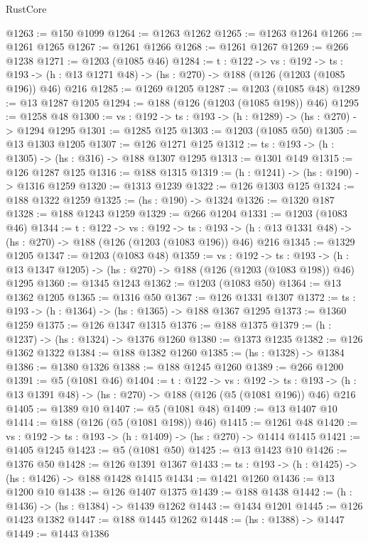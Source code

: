 \begin{lexlean}{RustCore}
\begin{coremodule}
@1263 := @150 @1099
@1264 := @1263 @1262
@1265 := @1263 @1264
@1266 := @1261 @1265
@1267 := @1261 @1266
@1268 := @1261 @1267
@1269 := @266 @1238
@1271 := @1203 (@1085 @46)
@1284 := {t : @122} ->
  {vs : @192} ->
  {ts : @193} -> (h : @13 @1271 @48) -> (hs : @270) -> @188 (@126 (@1203 (@1085 @196)) @46) @216
@1285 := @1269 @1205
@1287 := @1203 (@1085 @48)
@1289 := @13 @1287 @1205
@1294 := @188 (@126 (@1203 (@1085 @198)) @46)
@1295 := @1258 @48
@1300 := {vs : @192} -> {ts : @193} -> (h : @1289) -> (hs : @270) -> @1294 @1295
@1301 := @1285 @125
@1303 := @1203 (@1085 @50)
@1305 := @13 @1303 @1205
@1307 := @126 @1271 @125
@1312 := {ts : @193} -> (h : @1305) -> (hs : @316) -> @188 @1307 @1295
@1313 := @1301 @149
@1315 := @126 @1287 @125
@1316 := @188 @1315
@1319 := (h : @1241) -> (hs : @190) -> @1316 @1259
@1320 := @1313 @1239
@1322 := @126 @1303 @125
@1324 := @188 @1322 @1259
@1325 := (hs : @190) -> @1324
@1326 := @1320 @187
@1328 := @188 @1243 @1259
@1329 := @266 @1204
@1331 := @1203 (@1083 @46)
@1344 := {t : @122} ->
  {vs : @192} ->
  {ts : @193} -> (h : @13 @1331 @48) -> (hs : @270) -> @188 (@126 (@1203 (@1083 @196)) @46) @216
@1345 := @1329 @1205
@1347 := @1203 (@1083 @48)
@1359 := {vs : @192} ->
  {ts : @193} -> (h : @13 @1347 @1205) -> (hs : @270) -> @188 (@126 (@1203 (@1083 @198)) @46) @1295
@1360 := @1345 @1243
@1362 := @1203 (@1083 @50)
@1364 := @13 @1362 @1205
@1365 := @1316 @50
@1367 := @126 @1331 @1307
@1372 := {ts : @193} -> (h : @1364) -> (hs : @1365) -> @188 @1367 @1295
@1373 := @1360 @1259
@1375 := @126 @1347 @1315
@1376 := @188 @1375
@1379 := (h : @1237) -> (hs : @1324) -> @1376 @1260
@1380 := @1373 @1235
@1382 := @126 @1362 @1322
@1384 := @188 @1382 @1260
@1385 := (hs : @1328) -> @1384
@1386 := @1380 @1326
@1388 := @188 @1245 @1260
@1389 := @266 @1200
@1391 := @5 (@1081 @46)
@1404 := {t : @122} ->
  {vs : @192} ->
  {ts : @193} -> (h : @13 @1391 @48) -> (hs : @270) -> @188 (@126 (@5 (@1081 @196)) @46) @216
@1405 := @1389 @10
@1407 := @5 (@1081 @48)
@1409 := @13 @1407 @10
@1414 := @188 (@126 (@5 (@1081 @198)) @46)
@1415 := @1261 @48
@1420 := {vs : @192} -> {ts : @193} -> (h : @1409) -> (hs : @270) -> @1414 @1415
@1421 := @1405 @1245
@1423 := @5 (@1081 @50)
@1425 := @13 @1423 @10
@1426 := @1376 @50
@1428 := @126 @1391 @1367
@1433 := {ts : @193} -> (h : @1425) -> (hs : @1426) -> @188 @1428 @1415
@1434 := @1421 @1260
@1436 := @13 @1200 @10
@1438 := @126 @1407 @1375
@1439 := @188 @1438
@1442 := (h : @1436) -> (hs : @1384) -> @1439 @1262
@1443 := @1434 @1201
@1445 := @126 @1423 @1382
@1447 := @188 @1445 @1262
@1448 := (hs : @1388) -> @1447
@1449 := @1443 @1386

\end{coremodule}
\end{lexlean}
